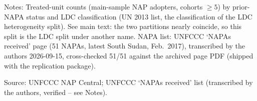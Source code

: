 \begin{table}[H]
\centering
\caption{Prior-NAPA status by LDC classification, main-sample NAP adopters}
\label{tab:prior_napa_ldc_crosstab}
\par\vspace{4pt}
\begin{minipage}{\linewidth}\footnotesize
Notes: Treated-unit counts (main-sample NAP adopters, cohorts $\geq 5$) by prior-NAPA status and LDC classification (UN 2013 list, the classification of the LDC heterogeneity split). See main text: the two partitions nearly coincide, so this split is the LDC split under another name. NAPA list: UNFCCC `NAPAs received' page (51 NAPAs, latest South Sudan, Feb.\ 2017), transcribed by the authors 2026-09-15, cross-checked 51/51 against the archived page PDF (shipped with the replication package).\par
Source: UNFCCC NAP Central; UNFCCC `NAPAs received' list (transcribed by the authors, verified -- see Notes).
\end{minipage}
\end{table}
